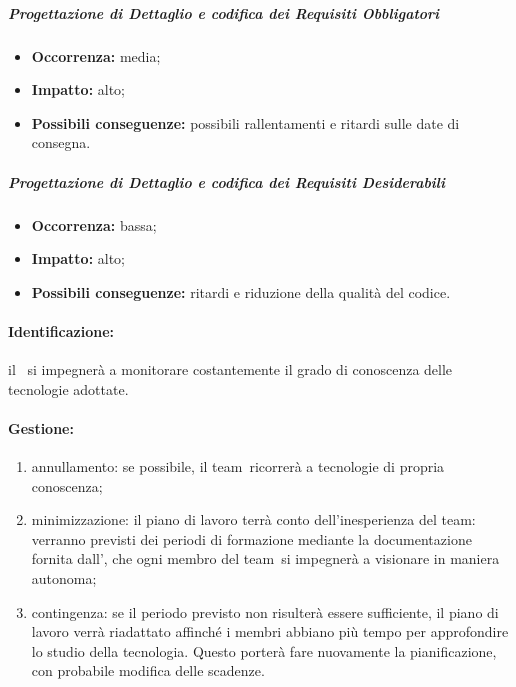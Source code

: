 \documentclass[../PianoProgetto.tex]{subfiles}
\begin{document}
		\subparagraph*{Progettazione di Dettaglio e codifica dei Requisiti Obbligatori}
			\begin{itemize}[label={-}]
				\item \textbf{Occorrenza:} media;
				\item \textbf{Impatto:} alto;
				\item \textbf{Possibili conseguenze:} possibili rallentamenti e ritardi sulle date di consegna.
			\end{itemize}
			
		\subparagraph*{Progettazione di Dettaglio e codifica dei Requisiti Desiderabili}
			\begin{itemize}[label={-}]
				\item \textbf{Occorrenza:} bassa;
				\item \textbf{Impatto:} alto;
				\item \textbf{Possibili conseguenze:} ritardi e riduzione della qualità del codice.
			\end{itemize}
			
	
	\paragraph*{Identificazione:} il \responsabilediprogetto\ si impegnerà a monitorare costantemente il grado di conoscenza delle tecnologie adottate.	
	
	\paragraph*{Gestione:}
	\begin{enumerate}
		\item annullamento: se possibile, il team\g\ ricorrerà a tecnologie di propria conoscenza;
		\item minimizzazione: il piano di lavoro terrà conto dell'inesperienza del team\g : verranno previsti dei periodi di formazione mediante la documentazione fornita dall'\amministratore , che ogni membro del team\g\ si impegnerà a visionare in maniera autonoma;
		\item contingenza: se il periodo previsto non risulterà essere sufficiente, il piano di lavoro verrà riadattato affinché i membri abbiano più tempo per approfondire lo studio della tecnologia. Questo porterà fare nuovamente la pianificazione, con probabile modifica delle scadenze.
	\end{enumerate}
	
\end{document}
